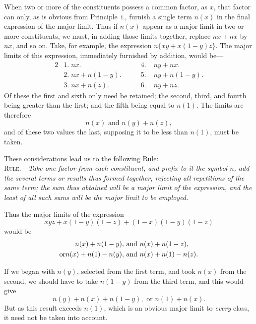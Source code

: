 \documentclass[oneside]{book}
\begin{document}
When two or more of the constituents possess a common factor,
as $x$, that factor can only, as is obvious from Principle~{\sc i}.,
furnish a single term $n(x)$ in the final expression of the major
limit. Thus if $n(x)$ appear as a major limit in two or more
constituents, we must, in adding those limits together, replace
$nx + nx$ by $nx$, and so on. Take, for example, the expression
$n\{xy + x (1-y)z\}$. The major limits of this expression, immediately
furnished by addition, would be---
\begin{alignat*}{2}
&1.\; nx.                  &4.\;& ny + nx. \\
&2.\; nx + n (1-y). \qquad &5.\;& ny + n (1-y).  \\
&3.\; nx + n (z).          &6.\;& ny + nz.
\end{alignat*}
Of these the first and sixth only need be retained; the second,
third, and fourth being greater than the first; and the fifth being
equal to $n(1)$. The limits are therefore
\[ n(x) \text{ and } n(y) + n(z),\]
and of these two values the last, supposing it to be less than $n(1)$,
must be taken.

These considerations lead us to the following Rule:\\

\textsc{Rule.}---{\it Take one factor from each constituent, and prefix to
it the symbol $n$, add the several terms or results thus formed
together, rejecting all repetitions of the same term; the sum thus
obtained will be a major limit of the expression, and the least of all
such sums will be the major limit to be employed.}

Thus the major limits of the expression
\[ xyz + x(1-y) (1-z) + (1-x) (1-y) (1-z)\]
would be
\begin{align*}
     n(x) + n(1 - y), &\text{ and } n(x) + n(1 - z),\\
\text{or}\hfill
  n(x) + n(1) - n(y), &\text{ and } n(x) + n(1) - n(z).\hfill
\end{align*}

If we began with $n(y)$, selected from the first term, and took
$n(x)$ from the second, we should have to take $n(1 - y)$ from the
third term, and this would give
\[
n(y) + n(x) + n(1 - y), \text{ or } n(1) + n(x).
\]
But as this result exceeds $n(1)$, which is an obvious major limit
to \emph{every} class, it need not be taken into account.
\end{document}
